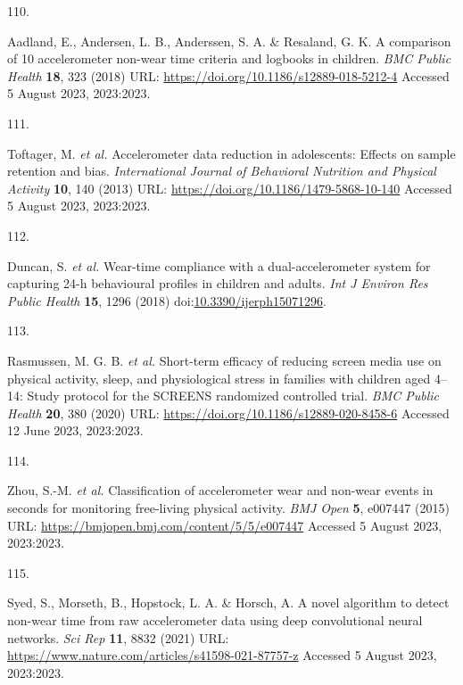 \documentclass[
  10pt,
]{scrbook}
\newlength{\cslhangindent}
\newlength{\csllabelwidth}
\newlength{\cslentryspacingunit} %
\newenvironment{CSLReferences}[2] %
 {%
  \setlength{\parindent}{0pt}
  \ifodd #1
  \let\oldpar\par
  \def\par{\hangindent=\cslhangindent\oldpar}
  \fi
  \setlength{\parskip}{#2\cslentryspacingunit}
 }%
 {}
\newcommand{\CSLLeftMargin}[1]{\parbox[t]{\csllabelwidth}{#1}}
\newcommand{\CSLRightInline}[1]{\parbox[t]{\linewidth - \csllabelwidth}{#1}\break}
\begin{document}
\begin{CSLReferences}{0}{0}
\leavevmode{}%
\CSLLeftMargin{110. }%
\CSLRightInline{Aadland, E., Andersen, L. B., Anderssen, S. A. \&
Resaland, G. K. A comparison of 10 accelerometer non-wear time criteria
and logbooks in children. \emph{{BMC} Public Health} \textbf{18}, 323
(2018) URL: \url{https://doi.org/10.1186/s12889-018-5212-4} Accessed 5
August 2023, 2023:2023.}

\leavevmode{}%
\CSLLeftMargin{111. }%
\CSLRightInline{Toftager, M. \emph{et al.} Accelerometer data reduction
in adolescents: Effects on sample retention and bias.
\emph{International Journal of Behavioral Nutrition and Physical
Activity} \textbf{10}, 140 (2013) URL:
\url{https://doi.org/10.1186/1479-5868-10-140} Accessed 5 August 2023,
2023:2023.}

\leavevmode{}%
\CSLLeftMargin{112. }%
\CSLRightInline{Duncan, S. \emph{et al.} Wear-time compliance with a
dual-accelerometer system for capturing 24-h behavioural profiles in
children and adults. \emph{Int J Environ Res Public Health} \textbf{15},
1296 (2018)
doi:\href{https://doi.org/10.3390/ijerph15071296}{10.3390/ijerph15071296}.}

\leavevmode{}%
\CSLLeftMargin{113. }%
\CSLRightInline{Rasmussen, M. G. B. \emph{et al.} Short-term efficacy of
reducing screen media use on physical activity, sleep, and physiological
stress in families with children aged 4--14: Study protocol for the
{SCREENS} randomized controlled trial. \emph{{BMC} Public Health}
\textbf{20}, 380 (2020) URL:
\url{https://doi.org/10.1186/s12889-020-8458-6} Accessed 12 June 2023,
2023:2023.}

\leavevmode{}%
\CSLLeftMargin{114. }%
\CSLRightInline{Zhou, S.-M. \emph{et al.} Classification of
accelerometer wear and non-wear events in seconds for monitoring
free-living physical activity. \emph{{BMJ} Open} \textbf{5}, e007447
(2015) URL: \url{https://bmjopen.bmj.com/content/5/5/e007447} Accessed 5
August 2023, 2023:2023.}

\leavevmode{}%
\CSLLeftMargin{115. }%
\CSLRightInline{Syed, S., Morseth, B., Hopstock, L. A. \& Horsch, A. A
novel algorithm to detect non-wear time from raw accelerometer data
using deep convolutional neural networks. \emph{Sci Rep} \textbf{11},
8832 (2021) URL:
\url{https://www.nature.com/articles/s41598-021-87757-z} Accessed 5
August 2023, 2023:2023.}


\end{CSLReferences}
\end{document}
